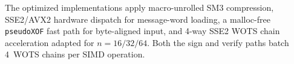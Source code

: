 The optimized implementations apply macro-unrolled SM3 compression, SSE2/AVX2
hardware dispatch for message-word loading, a malloc-free \texttt{pseudoXOF}
fast path for byte-aligned input, and 4-way SSE2 WOTS chain acceleration
adapted for $n=16/32/64$.  Both the sign and verify paths batch 4~WOTS chains
per SIMD operation.
